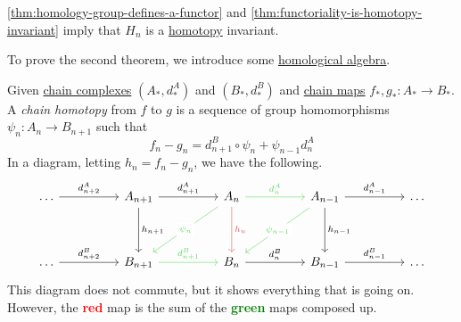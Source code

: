 \begin{exercise}
	\autoref{thm:homology-group-defines-a-functor} and \autoref{thm:functoriality-is-homotopy-invariant} imply that \(H_{n} \) is a \hyperref[def:homotopy]{homotopy} invariant.
\end{exercise}

To prove the second theorem, we introduce some \hyperref[sec:homological-algebra]{homological algebra}.

\begin{definition}\label{def:chain-homotopy}
	Given \hyperref[def:chain-complex]{chain complexes} $(A_\ast, d^A_\ast)$ and $(B_\ast, d^B_\ast)$ and \hyperref[def:chain-map]{chain maps}
	$f_\ast, g_\ast \colon  A_\ast \to B_\ast$. A \emph{chain homotopy} from $f$ to $g$ is a sequence of group homomorphisms $\psi_n\colon A_n \to B_{n + 1}$ such that
	\[
		f_n - g_n = d^B_{n + 1} \circ \psi_n + \psi_{n - 1} d_n^A
	\]
	In a diagram, letting $h_n = f_n - g_n$, we have the following.
	\[\begin{tikzcd}
			\ldots && {A_{n+1}} && {A_{n}} && {A_{n-1}} && \ldots \\
			\\
			\ldots && {B_{n+1}} && {B_{n}} && {B_{n-1}} && \ldots
			\arrow["{d^A_{n-1}}", from=1-7, to=1-9]
			\arrow["{d^B_{n-1}}", from=3-7, to=3-9]
			\arrow["{d^A_{n}}", color={rgb,255:red,92;green,214;blue,92}, from=1-5, to=1-7]
			\arrow["{d^B_{n}}", from=3-5, to=3-7]
			\arrow["{d^B_{n+1}}", color={rgb,255:red,92;green,214;blue,92}, from=3-3, to=3-5]
			\arrow["{d^A_{n+2}}", from=1-1, to=1-3]
			\arrow["{d^B_{n+2}}", from=3-1, to=3-3]
			\arrow["{h_{n+1}}", from=1-3, to=3-3]
			\arrow["{h_{n}}", color={rgb,255:red,214;green,92;blue,92}, from=1-5, to=3-5]
			\arrow["{h_{n-1}}", from=1-7, to=3-7]
			\arrow["{d^A_{n+1}}", from=1-3, to=1-5]
			\arrow["{\psi_n}"{description}, color={rgb,255:red,92;green,214;blue,92}, from=1-5, to=3-3]
			\arrow["{\psi_{n-1}}"{description}, color={rgb,255:red,92;green,214;blue,92}, from=1-7, to=3-5]
		\end{tikzcd}\]
	This diagram does not commute, but it shows everything that is going on. However, the \textbf{\textcolor{red}{red}} map is the sum of the
	\textbf{\textcolor{green}{green}} maps composed up.
\end{definition}

